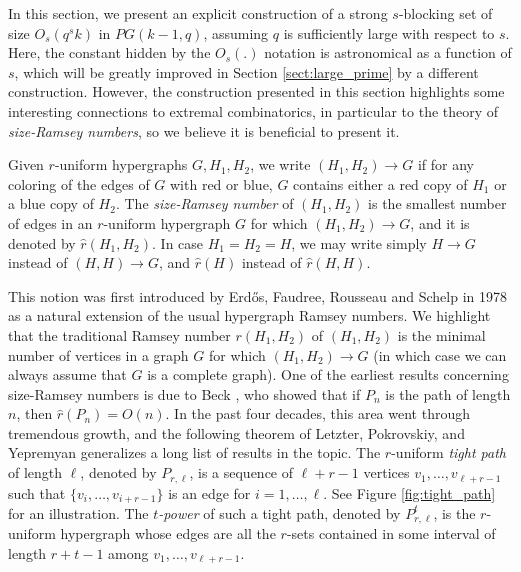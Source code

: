 \documentclass[11pt]{article}
\theoremstyle{plain}
\theoremstyle{definition}
\begin{document}
In this section, we present an explicit construction of a strong $s$-blocking set  of size $O_s(q^{s}k)$ in $PG(k-1,q)$, assuming $q$ is sufficiently large with respect to $s$. Here, the constant hidden by the $O_s(.)$ notation is astronomical as a function of $s$, which will be greatly improved in Section \ref{sect:large_prime} by a different construction. However, the construction presented in this section highlights  some interesting connections to extremal combinatorics, in particular to the theory of \emph{size-Ramsey numbers}, so we believe it is beneficial to present it.

Given $r$-uniform hypergraphs $G,H_1,H_2$, we write $(H_1,H_2)\rightarrow G$ if for any coloring of the edges of $G$ with red or blue, $G$ contains either a red copy of $H_1$ or a blue copy of $H_2$. The \emph{size-Ramsey number} of $(H_1,H_2)$ is the smallest number of edges in an $r$-uniform hypergraph $G$ for which $(H_1,H_2)\rightarrow G$, and it is denoted by $\hat{r}(H_1,H_2)$. In case $H_1=H_2=H$, we may write simply $H\rightarrow G$ instead of $(H,H)\rightarrow G$, and $\hat{r}(H)$ instead of $\hat{r}(H,H)$. 

This notion was first introduced by Erd\H{o}s, Faudree, Rousseau and Schelp in 1978 \cite{EFRS} as a natural extension of the usual hypergraph Ramsey numbers. We highlight that the traditional Ramsey number $r(H_1,H_2)$ of $(H_1,H_2)$ is the minimal number of vertices in a graph $G$ for which $(H_1,H_2)\rightarrow G$ (in which case we can always assume that $G$ is a complete graph). One of the earliest results concerning size-Ramsey numbers is due to Beck \cite{beck}, who showed that if $P_n$ is the path of length $n$, then $\hat{r}(P_n)=O(n)$. In the past four decades, this area went through tremendous growth, and the following theorem of Letzter,  Pokrovskiy, and Yepremyan \cite{LPY} generalizes a long list of results in the topic.  The $r$-uniform \emph{tight path} of length $\ell$, denoted by $P_{r,\ell}$, is a sequence of $\ell+r-1$ vertices $v_1,\dots,v_{\ell+r-1}$ such that $\{v_{i},\dots,v_{i+r-1}\}$ is an edge for $i=1,\dots,\ell$. See Figure \ref{fig:tight_path} for an illustration. The \emph{$t$-power} of such a tight path, denoted by $P_{r,\ell}^t$, is the $r$-uniform hypergraph whose edges are all the $r$-sets contained in some interval of length $r+t-1$ among $v_1,\dots,v_{\ell+r-1}$. 
\end{document}
